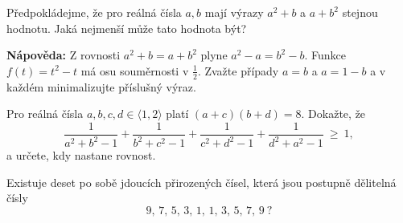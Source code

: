 \documentclass[12pt,a4paper]{article}
\begin{document}
\begin{exercise}
Předpokládejme, že pro reálná čísla $a,b$ mají výrazy $a^2+b$ a $a+b^2$ stejnou hodnotu.
Jaká nejmenší může tato hodnota být?
\end{exercise}

\begin{notebox}
\textbf{Nápověda:} Z rovnosti $a^2+b=a+b^2$ plyne $a^2-a=b^2-b$. Funkce $f(t)=t^2-t$ má osu souměrnosti v $\tfrac12$. Zvažte případy $a=b$ a $a=1-b$ a v každém minimalizujte příslušný výraz.
\end{notebox}


\begin{exercise}
Pro reálná čísla $a,b,c,d\in\langle 1,2\rangle$ platí $(a+c)(b+d)=8$. Dokažte, že
\[
\frac{1}{a^2+b^2-1}+\frac{1}{b^2+c^2-1}+\frac{1}{c^2+d^2-1}+\frac{1}{d^2+a^2-1}\ \ge\ 1,
\]
a určete, kdy nastane rovnost.
\end{exercise}


\begin{exercise}
Existuje deset po sobě jdoucích přirozených čísel, která jsou postupně dělitelná čísly
\[
9,\, 7,\, 5,\, 3,\, 1,\, 1,\, 3,\, 5,\, 7,\, 9\ ?
\]
\end{exercise}
\end{document}
